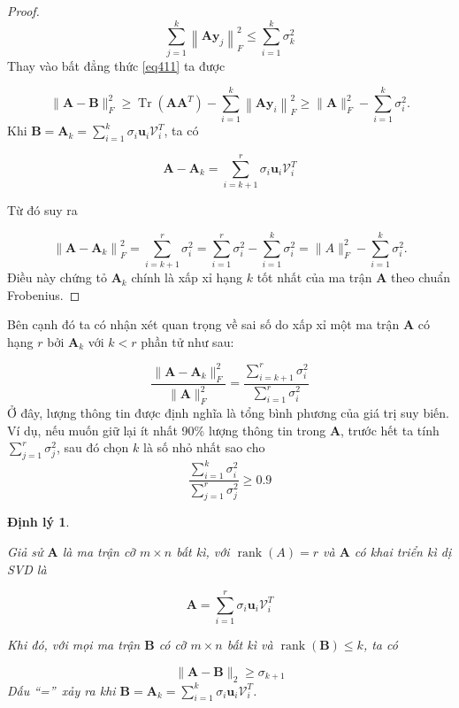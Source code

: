 \documentclass[12pt,a4paper,oneside]{report}
\newtheorem{dl}{Định lý}[section]
\numberwithin{equation}{section}
\begin{document}
\begin{proof}
$$
\sum_{j=1}^{k}\left\|\mathbf{A y}_{j}\right\|_{F}^{2} \leqslant \sum_{i=1}^{k} \sigma_{k}^{2}
$$
Thay vào bất đẳng thức \ref{eq411} ta được

$$
\|\mathbf{A}-\mathbf{B}\|_{F}^{2} \geqslant \operatorname{Tr}\left(\mathbf{A} \mathbf{A}^{T}\right)-\sum_{i=1}^{k}\left\|\mathbf{A} \mathbf{y}_{i}\right\|_{F}^{2} \geqslant\|\mathbf{A}\|_{F}^{2}-\sum_{i=1}^{k} \sigma_{i}^{2} .
$$
Khi $\mathbf{B}=\mathbf{A}_{k}=\sum_{i=1}^{k} \sigma_{i} \mathbf{u}_{i} \mathcal{V}_{i}^{T}$, ta có

$$
\mathbf{A}-\mathbf{A}_{k}=\sum_{i=k+1}^{r} \sigma_{i} \mathbf{u}_{i} \mathcal{V}_{i}^{T}
$$

Từ đó suy ra

$$
\left\|\mathbf{A}-\mathbf{A}_{k}\right\|_{F}^{2}=\sum_{i=k+1}^{r} \sigma_{i}^{2}=\sum_{i=1}^{r} \sigma_{i}^{2}-\sum_{i=1}^{k} \sigma_{i}^{2}=\|A\|_{F}^{2}-\sum_{i=1}^{k} \sigma_{i}^{2} .
$$
Điều này chứng tỏ $\mathbf{A}_{k}$ chính là xấp xỉ hạng $k$ tốt nhất của ma trận $\mathbf{A}$ theo chuẩn Frobenius.
\end{proof}
Bên cạnh đó ta có nhận xét quan trọng về sai số do xấp xỉ một ma trận $\mathbf{A}$ có hạng $r$ bởi $\mathbf{A}_{k}$ với $k < r$ phần tử như sau:

$$
	\label{eqn:26_17}
	\frac{\|\mathbf{A} - \mathbf{A}_k\|_F^2}{\|\mathbf{A}\|_F^2} = {\frac{\sum_{i=k+1}^{r} \sigma_{i}^{2}}{\sum_{i=1}^{r} \sigma_{i}^{2}}}
$$
Ở đây, {lượng thông tin} được định nghĩa
là tổng bình phương của giá trị suy biến. Ví dụ, nếu muốn giữ lại ít nhất
90\% lượng thông tin trong $\mathbf{A}$, trước hết ta tính $\sum_{j = 1}^r
\sigma_j^2$, sau đó chọn $k$ là số nhỏ nhất sao cho
$$
	\frac{\sum_{i = 1}^k \sigma_i^2}{\sum_{j = 1}^r \sigma_j^2} \geq 0.9
$$

\begin{dl} \cite{linh2016}

Giả sử $\mathbf{A}$ là ma trận cỡ $m \times n$ bất kì, với $\operatorname{rank}(A)=r$ và $\mathbf{A}$ có khai triển kì dị SVD là

$$
\mathbf{A}=\sum_{i=1}^{r} \sigma_{i} \mathbf{u}_{i} \mathcal{V}_{i}^{T}
$$

Khi đó, với mọi ma trận $\mathbf{B}$ có cỡ $m \times n$ bất kì và $\operatorname{rank}(\mathbf{B}) \leqslant k$, ta có

$$
\|\mathbf{A}-\mathbf{B}\|_{2} \geqslant \sigma_{k+1}
$$
Dấu \textquotedblleft  =\textquotedblright\ xảy ra khi $\mathbf{B}=\mathbf{A}_{k}=\sum_{i=1}^{k} \sigma_{i} \mathbf{u}_{i} \mathcal{V}_{i}^{T}$.
\end{dl}
\end{document}
